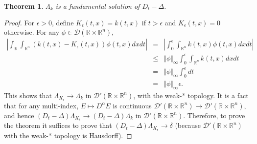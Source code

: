 \documentclass{article}
\newcommand{\norm}[1]{\Vert #1 \Vert}
\newtheorem{theorem}{Theorem}
\begin{document}
\begin{theorem}
$\Lambda_k$ is a fundamental solution of $D_t - \Delta$. 
\end{theorem}
\begin{proof}
For $\epsilon>0$, define $K_\epsilon(t,x)=k(t,x)$ if $t>\epsilon$ and $K_\epsilon(t,x)=0$ otherwise. For any $\phi \in \mathscr{D}(\mathbb{R}  \times
\mathbb{R}^n)$, 
\begin{eqnarray*}
\left|\int_{\mathbb{R}} \int_{\mathbb{R}^n} (k(t,x)-K_\epsilon(t,x)) \phi(t,x) dx dt\right|& =& \left|\int_{0}^\epsilon \int_{\mathbb{R}^n} k(t,x) \phi(t,x) dx dt \right|\\
&\leq&\norm{\phi}_\infty \int_{0}^\epsilon \int_{\mathbb{R}^n} k(t,x) dxdt\\
&=&\norm{\phi}_\infty \int_0^\epsilon dt\\
&=&\norm{\phi}_\infty \epsilon.
\end{eqnarray*}
This shows that $\Lambda_{K_\epsilon} \to \Lambda_k$ in $\mathscr{D}'(\mathbb{R} \times \mathbb{R}^n)$, with the weak-* topology. It is a fact that for any multi-index,
$E \mapsto D^\alpha E$ is continuous $\mathscr{D}'(\mathbb{R} \times \mathbb{R}^n) \to \mathscr{D}'(\mathbb{R} \times \mathbb{R}^n)$,
and hence $(D_t-\Delta)\Lambda_{K_\epsilon} \to (D_t-\Delta)\Lambda_k$ in $\mathscr{D}'(\mathbb{R} \times \mathbb{R}^n)$. Therefore,
to prove the theorem it suffices to prove that $(D_t-\Delta)\Lambda_{K_\epsilon} \to \delta$ (because $\mathscr{D}'(\mathbb{R} \times \mathbb{R}^n)$ with
the weak-* topology
is Hausdorff).


\end{proof}
\end{document}
